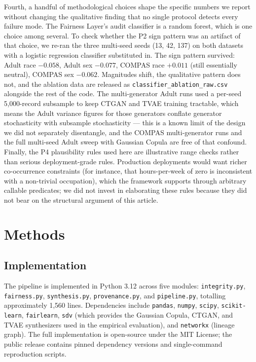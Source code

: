 \documentclass[11pt]{article}
\begin{document}
Fourth, a handful of methodological choices shape the specific numbers we report without changing the qualitative finding that no single protocol detects every failure mode. The Fairness Layer's audit classifier is a random forest, which is one choice among several. To check whether the P2 sign pattern was an artifact of that choice, we re-ran the three multi-seed seeds (13, 42, 137) on both datasets with a logistic regression classifier substituted in. The sign pattern survived: Adult race $-0.058$, Adult sex $-0.077$, COMPAS race $+0.011$ (still essentially neutral), COMPAS sex $-0.062$. Magnitudes shift, the qualitative pattern does not, and the ablation data are released as \texttt{classifier\_ablation\_raw.csv} alongside the rest of the code. The multi-generator Adult runs used a per-seed 5{,}000-record subsample to keep CTGAN and TVAE training tractable, which means the Adult variance figures for those generators conflate generator stochasticity with subsample stochasticity --- this is a known limit of the design we did not separately disentangle, and the COMPAS multi-generator runs and the full multi-seed Adult sweep with Gaussian Copula are free of that confound. Finally, the P4 plausibility rules used here are illustrative range checks rather than serious deployment-grade rules. Production deployments would want richer co-occurrence constraints (for instance, that hours-per-week of zero is inconsistent with a non-trivial occupation), which the framework supports through arbitrary callable predicates; we did not invest in elaborating these rules because they did not bear on the structural argument of this article.

\section{Methods}
\label{sec:methods}

\subsection{Implementation}

The pipeline is implemented in Python 3.12 across five modules: \texttt{integrity.py}, \texttt{fairness.py}, \texttt{synthesis.py}, \texttt{provenance.py}, and \texttt{pipeline.py}, totalling approximately 1,560 lines. Dependencies include \texttt{pandas}, \texttt{numpy}, \texttt{scipy}, \texttt{scikit-learn}, \texttt{fairlearn}, \texttt{sdv} (which provides the Gaussian Copula, CTGAN, and TVAE synthesizers used in the empirical evaluation), and \texttt{networkx} (lineage graph). The full implementation is open-source under the MIT License; the public release contains pinned dependency versions and single-command reproduction scripts.
\end{document}
